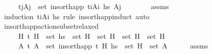 \begin{isabellebody}
\ \ \ \ \ {\isachardoublequoteopen}{\isasymforall}{\isacharparenleft}{\kern0pt}t\isactrlsub j{\isacharcomma}{\kern0pt}A\isactrlsub j{\isacharparenright}{\kern0pt}\ {\isasymin}\ set\ {\isacharparenleft}{\kern0pt}insort{\isacharunderscore}{\kern0pt}happ\ {\isacharparenleft}{\kern0pt}t\isactrlsub i{\isacharcomma}{\kern0pt}A\isactrlsub i{\isacharparenright}{\kern0pt}\ hs{\isacharparenright}{\kern0pt}{\isachardot}{\kern0pt}\ A\isactrlsub j\ {\isasymnoteq}\ {\isacharbrackleft}{\kern0pt}{\isacharbrackright}{\kern0pt}{\isachardoublequoteclose}\isanewline
%
\isadelimproof
\ \ \ \ %
\endisadelimproof
%
\isatagproof
{}\isamarkupfalse%
\ assms\ \isamarkupfalse%
\ {\isacharparenleft}{\kern0pt}induction\ {\isachardoublequoteopen}{\isacharparenleft}{\kern0pt}t\isactrlsub i{\isacharcomma}{\kern0pt}A\isactrlsub i{\isacharparenright}{\kern0pt}{\isachardoublequoteclose}\ hs\ rule{\isacharcolon}{\kern0pt}\ insort{\isacharunderscore}{\kern0pt}happ{\isachardot}{\kern0pt}induct{\isacharparenright}{\kern0pt}\ auto%
\endisatagproof
{\isafoldproof}%
%
\isadelimproof
\isanewline
%
\endisadelimproof
\isanewline
\ \ \isanewline
\ \ \isamarkupfalse%
\ insort{\isacharunderscore}{\kern0pt}happ{\isacharunderscore}{\kern0pt}action{\isacharunderscore}{\kern0pt}subset{\isacharunderscore}{\kern0pt}relaxed{\isacharcolon}{\kern0pt}\isanewline
\ \ \ \ \ {\isachardoublequoteopen}{\isacharparenleft}{\kern0pt}{\isasymexists}H{\isacharprime}{\kern0pt}{\isacharprime}{\kern0pt}{\isachardot}{\kern0pt}\ {\isacharparenleft}{\kern0pt}t{\isacharcomma}{\kern0pt}\ H{\isacharprime}{\kern0pt}{\isacharprime}{\kern0pt}{\isacharparenright}{\kern0pt}\ {\isasymin}\ set\ hs\ {\isasymand}\ set\ H\ {\isasymsubseteq}\ set\ H{\isacharprime}{\kern0pt}{\isacharprime}{\kern0pt}{\isacharparenright}{\kern0pt}\ {\isasymor}\ set\ H\ {\isasymsubseteq}\ set\ H{\isacharprime}{\kern0pt}{\isachardoublequoteclose}\isanewline
\ \ \ \ \ {\isachardoublequoteopen}{\isasymexists}A{\isachardot}{\kern0pt}\ {\isacharparenleft}{\kern0pt}t{\isacharcomma}{\kern0pt}\ A{\isacharparenright}{\kern0pt}\ {\isasymin}\ set\ {\isacharparenleft}{\kern0pt}insort{\isacharunderscore}{\kern0pt}happ\ {\isacharparenleft}{\kern0pt}t{\isacharcomma}{\kern0pt}\ H{\isacharprime}{\kern0pt}{\isacharparenright}{\kern0pt}\ hs{\isacharparenright}{\kern0pt}\ {\isasymand}\ set\ H\ {\isasymsubseteq}\ set\ A{\isachardoublequoteclose}\isanewline
%
\isadelimproof
\ \ \ \ %
\endisadelimproof
%
\isatagproof
{}\isamarkupfalse%
\ assms\isanewline

\end{isabellebody}
